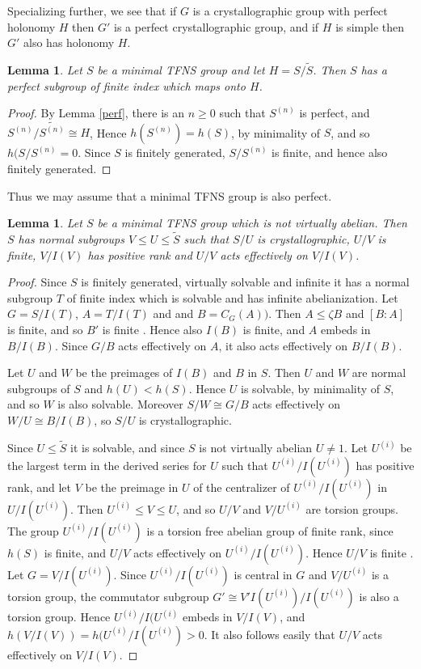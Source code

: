 \documentclass[12pt]{amsart}
\renewcommand{\geq}{\geqslant}
\renewcommand{\leq}{\leqslant}
\newtheorem{lemma}[theorem]{Lemma}
\begin{document}
Specializing further, we see that if $G$ is a crystallographic group 
with perfect holonomy $H$ then $G'$ is a perfect crystallographic group,
and if $H$ is simple then $G'$ also has holonomy $H$.

\begin{lemma}
\label{both}
Let $S$ be a minimal TFNS group and let $H=S/\widetilde{S}$.
Then $S$ has a perfect subgroup of finite index which maps onto $H$.
\end{lemma}

\begin{proof}
By Lemma \ref{perf},
there is an $n\geq0$ such that $S^{(n)}$ is perfect,
and  $S^{(n)}/\widetilde{S^{(n)}}\cong{H}$, 
Hence $h(S^{(n)})=h(S)$, by minimality of $S$,
and so $h(S/S^{(n)}=0$.
Since $S$ is finitely generated,
$S/S^{(n)}$ is finite,
and hence also finitely generated.
\end{proof}

Thus we may assume that a minimal TFNS group is also perfect.

\begin{lemma}
\label{overline}
Let $S$ be a minimal TFNS group which is not virtually abelian.
Then $S$ has normal subgroups $V\leq{U}\leq\widetilde{S}$ such that
$S/U$ is crystallographic,  $U/V$ is finite, $V/I(V)$ has positive rank
and $U/V$ acts effectively on $V/I(V)$.
\end{lemma}

\begin{proof}
Since $S$ is finitely generated, virtually solvable and infinite 
it has a normal subgroup $T$ of finite index which is solvable 
and has infinite abelianization.
Let $G=S/I(T)$, $A=T/I(T)$ and and $B=C_G(A))$.
Then $A\leq\zeta{B}$ and $[B:A]$ is finite, 
and so $B'$ is finite \cite[10.1.4]{Ro}.
Hence also $I(B)$ is finite, 
and $A$ embeds in $B/I(B)$.
Since $G/B$ acts effectively on $A$, it also acts effectively on $B/I(B)$.

Let $U$ and $W$ be the preimages of $I(B)$ and $B$ in $S$.
Then $U$ and $W$ are normal subgroups of $S$ and $h(U)<h(S)$.
Hence $U$ is solvable,  by minimality of $S$, and so $W$ is also solvable.
Moreover $S/W\cong{G/B}$ acts effectively on $W/U\cong{B/I(B)}$,
so $S/U$ is crystallographic.

Since $U\leq\widetilde{S}$ it is solvable, 
and since $S$ is not virtually abelian $U\not=1$.
Let $U^{(i)}$ be the largest term in the derived series for $U$ such that
$U^{(i)}/I(U^{(i)})$ has positive rank,
and let $V$ be the preimage in $U$ of the centralizer of $U^{(i)}/I(U^{(i)})$ 
in $U/I(U^{(i)})$. 
Then $U^{(i)}\leq{V}\leq{U}$, and so $U/V$ and $V/U^{(i)}$ are torsion groups. 
The group $U^{(i)}/I(U^{(i)})$ is a torsion free abelian group of finite rank,
since $h(S)$ is finite, and $U/V$ acts effectively on $U^{(i)}/I(U^{(i)})$.
Hence $U/V$ is finite \cite[8.1.11]{Ro}.
Let $G=V/I(U^{(i)})$.
Since $U^{(i)}/I(U^{(i)})$ is central in $G$ and $V/U^{(i)}$ is a torsion group,
the commutator subgroup $G'\cong{V'I(U^{(i)})/I(U^{(i)})}$ is also a torsion group.
Hence $U^{(i)}/I(U^{(i)}$ embeds in $V/I(V)$,
and $h(V/I(V))=h(U^{(i)}/I(U^{(i)})>0$.
It also follows easily that $U/V$ acts effectively on $V/I(V)$.
\end{proof}
\end{document}
